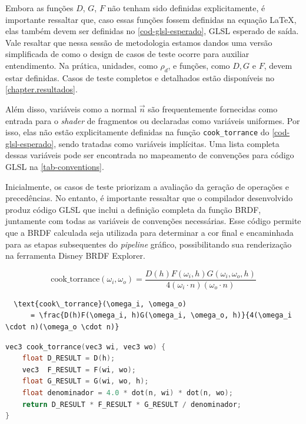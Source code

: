 Embora as funções \(D\), \(G\), \(F\) não tenham sido definidas explicitamente, é importante ressaltar que, caso essas funções fossem definidas na equação \LaTeX{}, elas também devem ser definidas no \autoref{cod-glsl-esperado}, GLSL esperado de saída. Vale resaltar que nessa sessão de metodologia estamos dandos uma versão simplificada de como o design de casos de teste ocorre para auxiliar entendimento. Na prática, unidades, como $\rho_d$, e funções, como $D,G$ e $F$, devem estar definidas. Casos de teste completos e detalhados estão disponíveis no \autoref{chapter.resultados}.


Além disso, variáveis como a normal \( \vec{n} \) são frequentemente fornecidas como entrada para o \textit{shader} de fragmentos ou declaradas como variáveis uniformes. Por isso, elas não estão explicitamente definidas na função \texttt{cook\_torrance} do \autoref{cod-glsl-esperado}, sendo tratadas como variáveis implícitas. Uma lista completa dessas variáveis pode ser encontrada no mapeamento de convenções para código GLSL na \autoref{tab-conventions}.

Inicialmente, os casos de teste priorizam a avaliação da geração de operações e precedências. No entanto, é importante ressaltar que o compilador desenvolvido produz código GLSL que inclui a definição completa da função BRDF, juntamente com todas as variáveis de convenções necessárias. Esse código permite que a BRDF calculada seja utilizada para determinar a cor final e encaminhada para as etapas subsequentes do \textit{pipeline} gráfico, possibilitando sua renderização na ferramenta Disney BRDF Explorer.


\begin{equation} \label{eq-cook-torrance}
  \text{cook\_torrance}(\omega_i, \omega_o) = \frac{D(h)F(\omega_i, h)G(\omega_i, \omega_o, h)}{4(\omega_i \cdot n)(\omega_o \cdot n)}
\end{equation}


\begin{codigo}[H]
\caption{\small Entrada em \LaTeX\  (Cook-Torrance BRDF).}
\label{cod-input-latex}
\begin{lstlisting}
  \text{cook\_torrance}(\omega_i, \omega_o)
      = \frac{D(h)F(\omega_i, h)G(\omega_i, \omega_o, h)}{4(\omega_i \cdot n)(\omega_o \cdot n)}
\end{lstlisting}
\end{codigo}


\begin{codigo}[H]
\caption{\small Saída em GLSL esperada (Cook-Torrance BRDF).}
\label{cod-glsl-esperado}
\begin{lstlisting}[language=C]
vec3 cook_torrance(vec3 wi, vec3 wo) {
    float D_RESULT = D(h);
    vec3  F_RESULT = F(wi, wo);
    float G_RESULT = G(wi, wo, h);
    float denominador = 4.0 * dot(n, wi) * dot(n, wo);
    return D_RESULT * F_RESULT * G_RESULT / denominador;
}
\end{lstlisting}
\end{codigo}


